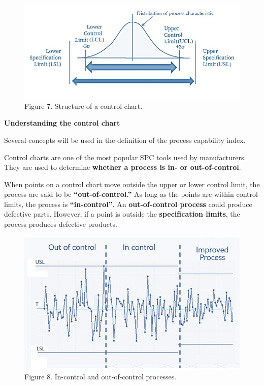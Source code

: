 \documentclass[
]{article}
\begin{document}
\begin{figure}

{\centering \includegraphics[width=9.11in]{img/w10-control-spec-limits} 

}

\caption{Figure 7. Structure of a control chart.}\label{fig:unnamed-chunk-9}
\end{figure}

\textbf{Understanding the control chart}

Several concepts will be used in the definition of the process
capability index.

Control charts are one of the most popular SPC tools used by
manufacturers. They are used to determine \textbf{whether a process is
in- or out-of-control}.

When points on a control chart move outside the upper or lower control
limit, the process are said to be \textbf{``out-of-control.''} As long
as the points are within control limits, the process is
\textbf{``in-control''}. An \textbf{out-of-control process} could
produce defective parts. However, if a point is outside the
\textbf{specification limits}, the process produces defective products.

\begin{figure}

{\centering \includegraphics[width=7.78in]{img/w10-control-chart} 

}

\caption{Figure 8. In-control and out-of-control processes.}\label{fig:unnamed-chunk-10}
\end{figure}
\end{document}
